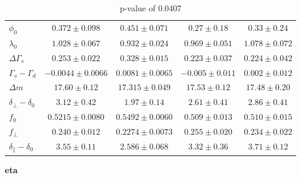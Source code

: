 \documentclass[aspectratio=43]{beamer}
\begin{document}
\begin{frame}
\begin{table}[H]
{\begin{tabular}{l|cccc}
\hline
$                        \phi_0$ & $     0.372 \pm 0.098$ & $     0.451 \pm 0.071$ & $       0.27 \pm 0.18$ & $       0.33 \pm 0.24$ \\
$                     \lambda_0$ & $     1.028 \pm 0.067$ & $     0.932 \pm 0.024$ & $     0.969 \pm 0.051$ & $     1.078 \pm 0.072$ \\
$                \Delta\Gamma_s$ & $     0.253 \pm 0.022$ & $     0.328 \pm 0.015$ & $     0.223 \pm 0.037$ & $     0.224 \pm 0.042$ \\
$           \Gamma_s - \Gamma_d$ & $  -0.0044 \pm 0.0066$ & $   0.0081 \pm 0.0065$ & $    -0.005 \pm 0.011$ & $     0.002 \pm 0.012$ \\
$                      \Delta m$ & $      17.60 \pm 0.12$ & $    17.315 \pm 0.049$ & $      17.53 \pm 0.12$ & $      17.48 \pm 0.20$ \\
$     \delta_{\perp} - \delta_0$ & $       3.12 \pm 0.42$ & $       1.97 \pm 0.14$ & $       2.61 \pm 0.41$ & $       2.86 \pm 0.41$ \\
$                           f_0$ & $   0.5215 \pm 0.0080$ & $   0.5492 \pm 0.0060$ & $     0.509 \pm 0.013$ & $     0.510 \pm 0.015$ \\
$                     f_{\perp}$ & $     0.240 \pm 0.012$ & $   0.2274 \pm 0.0073$ & $     0.255 \pm 0.020$ & $     0.234 \pm 0.022$ \\
$ \delta_{\parallel} - \delta_0$ & $       3.55 \pm 0.11$ & $     2.586 \pm 0.068$ & $       3.32 \pm 0.36$ & $       3.71 \pm 0.12$ \\
\end{tabular}}
\caption{
p-value of 0.0407
}\end{table}
\newpage \textbf{ eta }
\begin{table}[H]
\end{table}
\end{frame}
\end{document}
